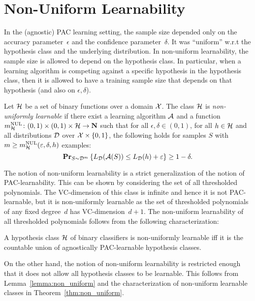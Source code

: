 \chapter{Non-Uniform Learnability}

In the (agnostic) PAC learning setting, the sample size depended only on the
accuracy parameter~$\epsilon$ and the confidence parameter~$\delta$. It was ``uniform''
w.r.t the hypothesis class and the underlying distribution. In non-uniform
learnability, the sample size is allowed to depend on the hypothesis class.
In particular, when a learning algorithm is competing against a specific hypothesis
in the hypothesis class, then it is allowed to have a training sample size that depends
on that hypothesis (and also on $\epsilon, \delta$).

\begin{definition}
Let $\mathcal{H}$ be a set of binary functions over a domain $\mathcal{X}$.  The class
$\mathcal{H}$ is \emph{non-uniformly learnable} if there exist a learning
algorithm $\mathcal{A}$ and a function $m_{\mathcal{H}}^{\text{NUL}} \colon (0, 1) \times (0, 1)
\times \mathcal{H} \rightarrow \mathbf{N}$ such that for all $\epsilon, \delta \in (0,
1)$, for all $h \in \mathcal{H}$ and all distributions $\mathcal{D}$ over
$\mathcal{X} \times \{0, 1\}$, the following holds for samples $S$
with $m \geq m_{\mathcal{H}}^{\text{NUL}}(\varepsilon, \delta, h)$ examples:
\[
    \mathbf{Pr}_{S \sim \mathcal{D}^m} \left \{ L_{\mathcal{D}}(\mathcal{A} (S)) \leq L_{\mathcal{D}} (h) + \varepsilon \right \} \geq 1 - \delta.
\]
\end{definition}

The notion of non-uniform learnability is a strict generalization of the notion of
PAC-learnability. This can be shown by considering the set of all thresholded
polynomials. The VC-dimension of this class is infinite and hence it is not PAC-learnable, but
it is non-uniformly learnable as the set of thresholded polynomials of any fixed degree~$d$
has VC-dimension~$d + 1$. The non-uniform learnability of all thresholded polynomials
follows from the following characterization:

\begin{theorem} \label{thm:non_uniform}
A hypothesis class $\mathcal{H}$ of binary classifiers is non-uniformly learnable iff it
is the countable union of agnostically PAC-learnable hypothesis classes.
\end{theorem}

On the other hand, the notion of non-uniform learnability is restricted enough
that it does not allow all hypothesis classes to be learnable. This follows
from Lemma~\ref{lemma:non_uniform} and the characterization of non-uniform
learnable classes in Theorem~\ref{thm:non_uniform}.

